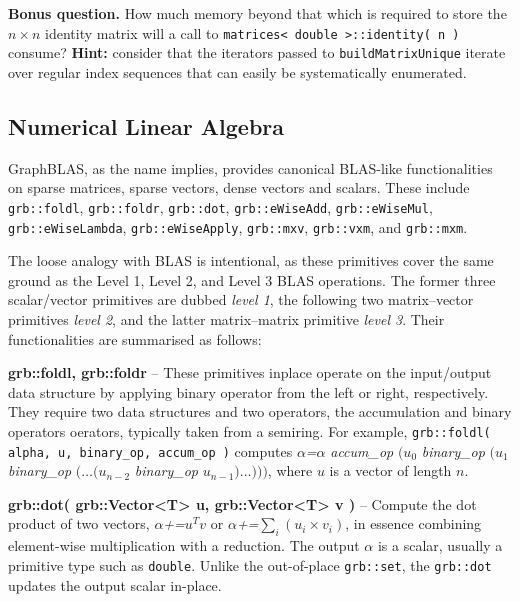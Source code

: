 \noindent \textbf{Bonus question.} How much memory beyond that which is required to store the $n\times n$ identity matrix will a call to \texttt{matrices< double >::identity( n )} consume? \textbf{Hint:} consider that the iterators passed to \texttt{buildMatrixUnique} iterate over regular index sequences that can easily be systematically enumerated.

\subsection{Numerical Linear Algebra}

GraphBLAS, as the name implies, provides canonical BLAS-like functionalities on sparse matrices, sparse vectors, dense vectors and scalars. 
These include \texttt{grb::foldl}, \texttt{grb::foldr}, \texttt{grb::dot}, \texttt{grb::eWiseAdd}, 
\texttt{grb::eWiseMul}, \texttt{grb::eWiseLambda}, \texttt{grb::eWiseApply}, \texttt{grb::mxv}, 
\texttt{grb::vxm}, and \texttt{grb::mxm}. 

The loose analogy with BLAS is intentional, as these primitives cover the same ground as the Level 1, Level 2, and Level 3 BLAS operations.
The former three scalar/vector primitives are dubbed \emph{level 1}, the following two matrix--vector primitives \emph{level 2}, and the latter matrix--matrix primitive \emph{level 3}. Their functionalities are summarised as follows:\newline

    \textbf{grb::foldl, grb::foldr} – These primitives inplace operate on the input/output data structure by applying binary operator from the left or right, respectively. 
    They require two data structures and two operators, the accumulation and binary operators oerators, typically taken from a semiring.
    For example, \texttt{grb::foldl( alpha, u, binary\_op, accum\_op )} computes $\alpha$\textit{=}$\alpha$ \textit{accum\_op} $(u_0$ \textit{binary\_op} $(u_1$ \textit{binary\_op} $(\ldots (u_{n-2}$ \textit{binary\_op} $u_{n-1})\ldots)))$, where $u$ is a vector of length $n$.

    \textbf{grb::dot( grb::Vector<T> u, grb::Vector<T> v )} – Compute the dot product of two vectors, $\alpha$\textit{+=}$u^Tv$ or $\alpha$\textit{+=}$\sum_i (u_i \times v_i)$, in essence combining element-wise multiplication with a reduction. The output $\alpha$ is a scalar, usually a primitive type such as \texttt{double}. Unlike the out-of-place \texttt{grb::set}, the \texttt{grb::dot} updates the output scalar in-place.\newline

